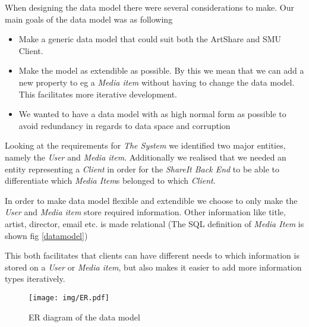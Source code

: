 \documentclass[../report.tex]{subfiles}
\begin{document}
When designing the data model there were several considerations to make. Our main goals of the data model was as following
\begin{itemize}
\item Make a generic data model that could suit both the ArtShare and SMU Client.
\item Make the model as extendible as possible. By this we mean that we can add a new property to eg a \textit{Media item} without having to change the data model. This facilitates more iterative development.
\item We wanted to have a data model with as high normal form as possible to avoid redundancy in regards to data space and corruption
\end{itemize} 






Looking at the requirements for \textit{The System} we identified two major entities, namely the \textit{User} and \textit{Media item}. Additionally we realised that we needed an entity representing a \textit{Client} in order for the \textit{ShareIt Back End} to be able to differentiate which \textit{Media Item}s belonged to which \textit{Client}. 

In order to make data model flexible and extendible we choose to only make the \textit{User} and \textit{Media item} store required information. Other information like title, artist, director, email etc. is made relational (The SQL definition of \textit{Media Item} is shown fig \ref{datamodel})

This both facilitates that clients can have different needs to which information is stored on a \textit{User} or \textit{Media item}, but also makes it easier to add more information types iteratively. 

\begin{figure}[H]
\texttt{[image: img/ER.pdf]}
\caption{ER diagram of the data model}
\label{fig:use case diagram}
\end{figure}
\end{document}
